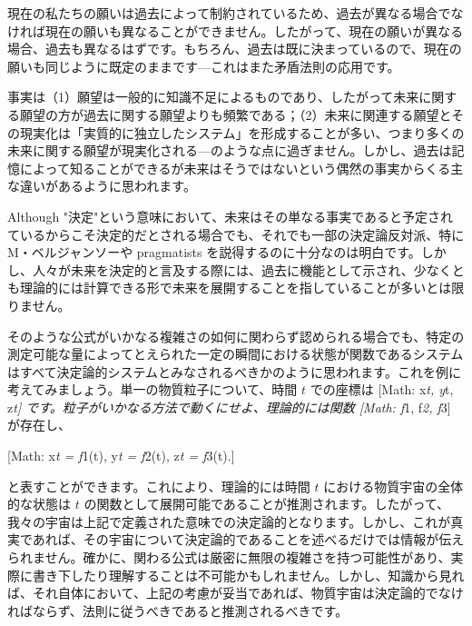 \documentclass[a4paper,11pt,openany]{ltjsbook}
\begin{document}
現在の私たちの願いは過去によって制約されているため、過去が異なる場合でなければ現在の願いも異なることができません。したがって、現在の願いが異なる場合、過去も異なるはずです。もちろん、過去は既に決まっているので、現在の願いも同じように既定のままです—これはまた矛盾法則の応用です。

事実は（1）願望は一般的に知識不足によるものであり、したがって未来に関する願望の方が過去に関する願望よりも頻繁である；（2）未来に関連する願望とその現実化は「実質的に独立したシステム」を形成することが多い、つまり多くの未来に関する願望が現実化される—のような点に過ぎません。しかし、過去は記憶によって知ることができるが未来はそうではないという偶然の事実からくる主な違いがあるように思われます。

Although "決定"という意味において、未来はその単なる事実であると予定されているからこそ決定的だとされる場合でも、それでも一部の決定論反対派、特にM・ベルジャンソーや pragmatists を説得するのに十分なのは明白です。しかし、人々が未来を決定的と言及する際には、過去に機能として示され、少なくとも理論的には計算できる形で未来を展開することを指していることが多いとは限りません。

そのような公式がいかなる複雑さの如何に関わらず認められる場合でも、特定の測定可能な量によってとえられた一定の瞬間における状態が関数であるシステムはすべて決定論的システムとみなされるべきかのように思われます。これを例に考えてみましょう。単一の物質粒子について、時間 $t$ での座標は [Math: x\textit{{t}, y}{t}, z\textit{{t}] です。粒子がいかなる方法で動くにせよ、理論的には関数 [Math: f}{1}, f\textit{{2}, f}{3}] が存在し、

[Math: x\textit{{t} = f}{1}(t), y\textit{{t} = f}{2}(t), z\textit{{t} = f}{3}(t).]

と表すことができます。これにより、理論的には時間 $t$ における物質宇宙の全体的な状態は $t$ の関数として展開可能であることが推測されます。したがって、我々の宇宙は上記で定義された意味での決定論的となります。しかし、これが真実であれば、その宇宙について決定論的であることを述べるだけでは情報が伝えられません。確かに、関わる公式は厳密に無限の複雑さを持つ可能性があり、実際に書き下したり理解することは不可能かもしれません。しかし、知識から見れば、それ自体において、上記の考慮が妥当であれば、物質宇宙は決定論的でなければならず、法則に従うべきであると推測されるべきです。
\end{document}

